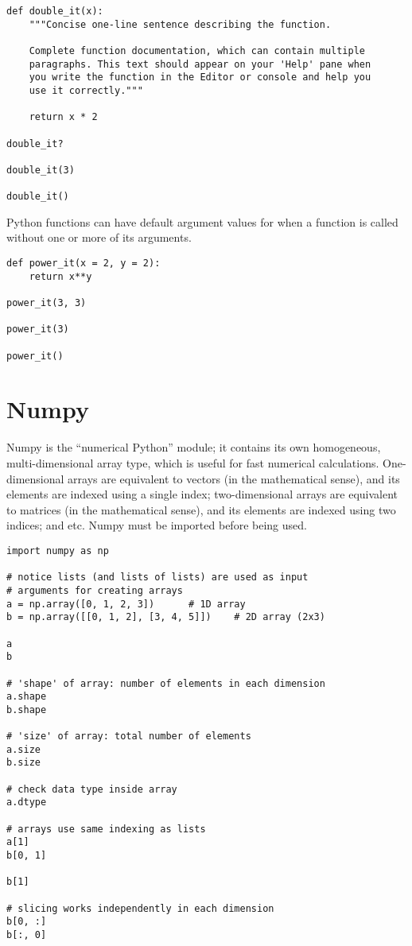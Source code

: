 \begin{lstlisting}[frame=single]
def double_it(x):
    """Concise one-line sentence describing the function.

    Complete function documentation, which can contain multiple
    paragraphs. This text should appear on your 'Help' pane when
    you write the function in the Editor or console and help you
    use it correctly."""
	
    return x * 2

double_it?

double_it(3)

double_it()
\end{lstlisting}

Python functions can have default argument values for when a function is called without one or more of its arguments.

\begin{lstlisting}[frame=single]
def power_it(x = 2, y = 2):
    return x**y

power_it(3, 3)

power_it(3)

power_it()
\end{lstlisting}

\section{Numpy}

Numpy is the ``numerical Python'' module; it contains its own homogeneous, multi-dimensional array type, which is useful for fast numerical calculations. One-dimensional arrays are equivalent to vectors (in the mathematical sense), and its elements are indexed using a single index; two-dimensional arrays are equivalent to matrices (in the mathematical sense), and its elements are indexed using two indices; and etc. Numpy must be imported before being used.

\begin{lstlisting}[frame=single]
import numpy as np

# notice lists (and lists of lists) are used as input
# arguments for creating arrays
a = np.array([0, 1, 2, 3])		# 1D array
b = np.array([[0, 1, 2], [3, 4, 5]])	# 2D array (2x3)

a
b

# 'shape' of array: number of elements in each dimension
a.shape
b.shape

# 'size' of array: total number of elements
a.size
b.size

# check data type inside array
a.dtype

# arrays use same indexing as lists
a[1]
b[0, 1]

b[1]

# slicing works independently in each dimension
b[0, :]
b[:, 0]
\end{lstlisting}

